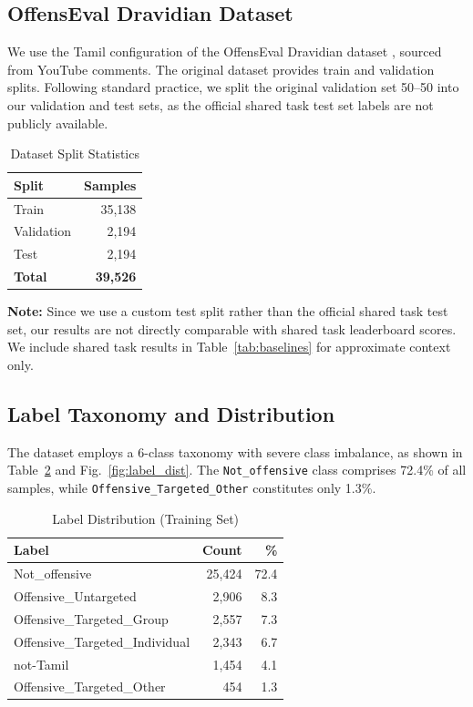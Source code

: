 \documentclass[conference]{IEEEtran}
\begin{document}
\subsection{OffensEval Dravidian Dataset}

We use the Tamil configuration of the OffensEval Dravidian dataset \cite{chakravarthi2021dataset}, sourced from YouTube comments. The original dataset provides train and validation splits. Following standard practice, we split the original validation set 50--50 into our validation and test sets, as the official shared task test set labels are not publicly available.

\begin{table}[!t]
\centering
\caption{Dataset Split Statistics}
\label{tab:dataset}
\begin{tabular}{lr}
\toprule
\textbf{Split} & \textbf{Samples} \\
\midrule
Train & 35,138 \\
Validation & 2,194 \\
Test & 2,194 \\
\midrule
\textbf{Total} & \textbf{39,526} \\
\bottomrule
\end{tabular}
\end{table}

\textbf{Note:} Since we use a custom test split rather than the official shared task test set, our results are not directly comparable with shared task leaderboard scores. We include shared task results in Table~\ref{tab:baselines} for approximate context only.

\subsection{Label Taxonomy and Distribution}

The dataset employs a 6-class taxonomy with severe class imbalance, as shown in Table~\ref{tab:labels} and Fig.~\ref{fig:label_dist}. The \texttt{Not\_offensive} class comprises 72.4\% of all samples, while \texttt{Offensive\_Targeted\_Other} constitutes only 1.3\%.

\begin{table}[!t]
\centering
\caption{Label Distribution (Training Set)}
\label{tab:labels}
\begin{tabular}{lrr}
\toprule
\textbf{Label} & \textbf{Count} & \textbf{\%} \\
\midrule
Not\_offensive & 25,424 & 72.4 \\
Offensive\_Untargeted & 2,906 & 8.3 \\
Offensive\_Targeted\_Group & 2,557 & 7.3 \\
Offensive\_Targeted\_Individual & 2,343 & 6.7 \\
not-Tamil & 1,454 & 4.1 \\
Offensive\_Targeted\_Other & 454 & 1.3 \\
\bottomrule
\end{tabular}
\end{table}
\end{document}
